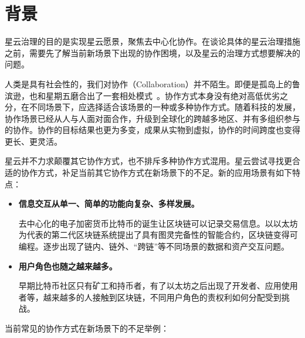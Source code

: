 \section{背景}

星云治理的目的是实现星云愿景，聚焦去中心化协作。在谈论具体的星云治理措施之前，需要先了解当前新场景下出现的协作困境，以及星云的治理方式想要解决的问题。

\label{background}

人类是具有社会性的，我们对协作（Collaboration）并不陌生。即便是孤岛上的鲁滨逊，也和星期五磨合出了一套相处模式~\cite{robinson}。协作方式本身没有绝对高低优劣之分，在不同场景下，应选择适合该场景的一种或多种协作方式。随着科技的发展，协作场景已经从人与人面对面合作，升级到全球化的跨越多地区、并有多组织参与的协作。协作的目标结果也更为多变，成果从实物到虚拟，协作的时间跨度也变得更长、更灵活。

星云并不力求颠覆其它协作方式，也不排斥多种协作方式混用。星云尝试寻找更合适的协作方式，补足当前其它协作方式在新场景下的不足。新的应用场景有如下特点：

\begin{itemize}
	\item \textbf{信息交互从单⼀、简单的功能向复杂、多样发展。}
	
	去中心化的电子加密货币比特币的诞生让区块链可以记录交易信息。以以太坊为代表的第二代区块链系统提出了具有图灵完备性的智能合约，区块链变得可编程。逐步出现了链内、链外、“跨链”等不同场景的数据和资产交互问题。

	\item \textbf{用户角色也随之越来越多。}

	早期比特币社区只有矿工和持币者，有了以太坊之后出现了开发者、应用使用者等，越来越多的人接触到区块链，不同用户角色的责权利如何分配受到挑战。

\end{itemize}

当前常见的协作方式在新场景下的不足举例：

